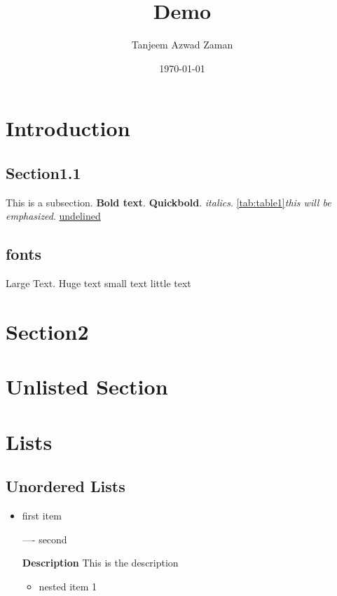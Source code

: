 \documentclass{article}
\title{Demo}
\author{Tanjeem Azwad Zaman}
\date{\today}
\begin{document}
\maketitle
\pagebreak
\tableofcontents
\pagebreak
\listoftables
\pagebreak
% 
\section{Introduction}
    \subsection{Section1.1}
        This is a subsection. \textbf{Bold text}. \textbf{Quickbold}. \textit{italics}. \ref{tab:table1}\emph{this will be emphasized}. \underline{undelined}
    \subsection{fonts}
        \Large{Large Text}. {\huge Huge text} \small{small text} {\small little text }
\section{Section2}
\section*{Unlisted Section}
\section{Lists}
    \subsection{Unordered Lists}
        \begin{itemize}
            \item first item
            \item[----] second %
            \item [\textbf{Description}] This is the description

            \begin{itemize}
                \item nested item 1
            \end{itemize}
        \end{itemize}
\end{document}
